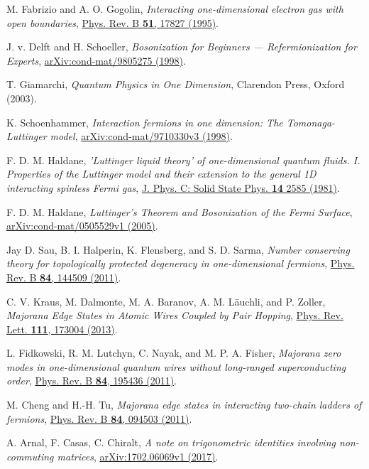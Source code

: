 \documentclass[english]{scrartcl}
\begin{document}
\newpage
\begin{thebibliography}{10}
M. Fabrizio and A. O. Gogolin, {\em Interacting one-dimensional electron gas with open boundaries}, \href{https://journals.aps.org/prb/abstract/10.1103/PhysRevB.51.17827}{Phys. Rev. B {\bfseries 51}, 17827 (1995)}.


J. v. Delft and H. Schoeller, {\em Bosonization for Beginners — Refermionization for Experts}, \href{https://arxiv.org/abs/cond-mat/9805275}{ arXiv:cond-mat/9805275 (1998)}.

T. Giamarchi, {\em Quantum Physics in One Dimension}, Clarendon Press, Oxford (2003).

K. Schoenhammer, {\em Interaction fermions in one dimension: The Tomonaga-Luttinger model}, \href{https://arxiv.org/abs/cond-mat/9710330}{ arXiv:cond-mat/9710330v3 (1998)}.

F. D. M. Haldane, {\em 'Luttinger liquid theory' of one-dimensional quantum fluids. I. Properties of the Luttinger model and their extension to the general 1D interacting spinless Fermi gas},
\href{https://iopscience.iop.org/article/10.1088/0022-3719/14/19/010/meta}{J. Phys. C: Solid State Phys. {\bfseries 14} 2585 (1981)}.

F. D. M. Haldane, {\em Luttinger's Theorem and Bosonization of the Fermi Surface}, \href{https://arxiv.org/abs/cond-mat/0505529}{arXiv:cond-mat/0505529v1 (2005)}.

Jay D. Sau, B. I. Halperin, K. Flensberg, and S. D. Sarma, {\em Number conserving theory for topologically protected degeneracy in one-dimensional fermions}, \href{https://journals.aps.org/prb/abstract/10.1103/PhysRevB.84.144509}{Phys. Rev. B {\bfseries 84}, 144509 (2011)}.

C. V. Kraus, M. Dalmonte, M. A. Baranov, A. M. Läuchli, and P. Zoller, {\em Majorana Edge States in Atomic Wires Coupled by Pair Hopping}, \href{https://journals.aps.org/prl/abstract/10.1103/PhysRevLett.111.173004}{Phys. Rev. Lett. {\bfseries 111}, 173004 (2013)}.

L. Fidkowski, R. M. Lutchyn, C. Nayak, and M. P. A. Fisher, {\em Majorana zero modes in one-dimensional quantum wires without
long-ranged superconducting order}, \href{https://journals.aps.org/prb/abstract/10.1103/PhysRevB.84.195436}{Phys. Rev. B {\bfseries 84}, 195436 (2011)}.

M. Cheng and H.-H. Tu, {\em Majorana edge states in interacting two-chain ladders of fermions}, \href{https://journals.aps.org/prb/abstract/10.1103/PhysRevB.84.094503}{Phys. Rev. B {\bfseries 84}, 094503 (2011)}.

A. Arnal, F. Casas, C. Chiralt, {\em A note on trigonometric identities involving non-commuting matrices}, \href{https://arxiv.org/abs/1702.06069}{arXiv:1702.06069v1 (2017)}.

\end{thebibliography}
\end{document}
